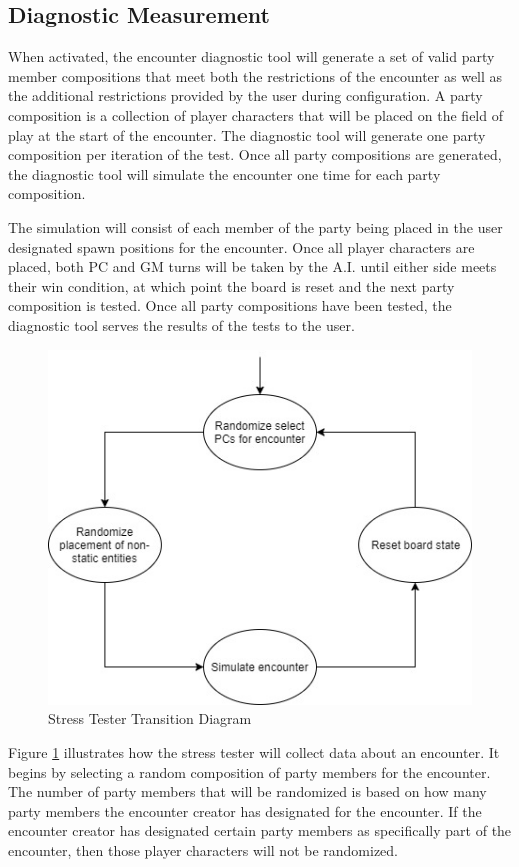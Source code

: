 \documentclass[12pt,a4paper]{report}
\begin{document}
		\subsection{Diagnostic Measurement}
		When activated, the encounter diagnostic tool will generate a set of valid party member compositions that meet both the restrictions of the encounter as well as the additional restrictions provided by the user during configuration. A party composition is a collection of player characters that will be placed on the field of play at the start of the encounter. The diagnostic tool will generate one party composition per iteration of the test. Once all party compositions are generated, the diagnostic tool will simulate the encounter one time for each party composition. 
		
		The simulation will consist of each member of the party being placed in the user designated spawn positions for the encounter. Once all player characters are placed, both PC and GM turns will be taken by the A.I. until either side meets their win condition, at which point the board is reset and the next party composition is tested. Once all party compositions have been tested, the diagnostic tool serves the results of the tests to the user.
		
		\begin{figure}[H]
			\centering
			\includegraphics[scale=.8]{StressTesterTransitionDiag}
			\caption{Stress Tester Transition Diagram}
			\label{fig: Stress Tester Transition Diagram}
		\end{figure}
		
		Figure \ref{fig: Stress Tester Transition Diagram} illustrates how the stress tester will collect data about an encounter. It begins by selecting a random composition of party members for the encounter. The number of party members that will be randomized is based on how many party members the encounter creator has designated for the encounter. If the encounter creator has designated certain party members as specifically part of the encounter, then those player characters will not be randomized. 
		
\end{document}
